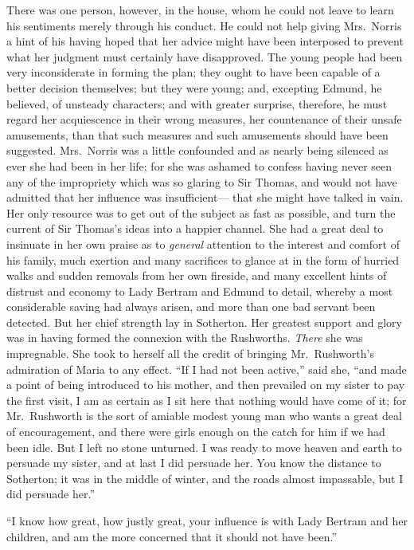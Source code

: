 There was one person, however, in the house, whom he could
not leave to learn his sentiments merely through his conduct.
He could not help giving Mrs.\ Norris a hint of his having
hoped that her advice might have been interposed to prevent
what her judgment must certainly have disapproved.  The young
people had been very inconsiderate in forming the plan;
they ought to have been capable of a better decision themselves;
but they were young; and, excepting Edmund, he believed,
of unsteady characters; and with greater surprise, therefore,
he must regard her acquiescence in their wrong measures,
her countenance of their unsafe amusements, than that such
measures and such amusements should have been suggested.
Mrs.\ Norris was a little confounded and as nearly being
silenced as ever she had been in her life; for she
was ashamed to confess having never seen any of the
impropriety which was so glaring to Sir Thomas, and would
not have admitted that her influence was insufficient---%
that she might have talked in vain.  Her only resource
was to get out of the subject as fast as possible, and turn
the current of Sir Thomas's ideas into a happier channel.
She had a great deal to insinuate in her own praise
as to \emph{general} attention to the interest and comfort
of his family, much exertion and many sacrifices to glance
at in the form of hurried walks and sudden removals from
her own fireside, and many excellent hints of distrust
and economy to Lady Bertram and Edmund to detail,
whereby a most considerable saving had always arisen,
and more than one bad servant been detected.  But her chief
strength lay in Sotherton.  Her greatest support and glory
was in having formed the connexion with the Rushworths.
\emph{There} she was impregnable.  She took to herself all
the credit of bringing Mr.\ Rushworth's admiration of Maria
to any effect.  ``If I had not been active,'' said she,
``and made a point of being introduced to his mother,
and then prevailed on my sister to pay the first visit,
I am as certain as I sit here that nothing would have
come of it; for Mr.\ Rushworth is the sort of amiable
modest young man who wants a great deal of encouragement,
and there were girls enough on the catch for him if we
had been idle.  But I left no stone unturned.  I was
ready to move heaven and earth to persuade my sister,
and at last I did persuade her.  You know the distance
to Sotherton; it was in the middle of winter, and the roads
almost impassable, but I did persuade her.''

``I know how great, how justly great, your influence
is with Lady Bertram and her children, and am the more
concerned that it should not have been.''

